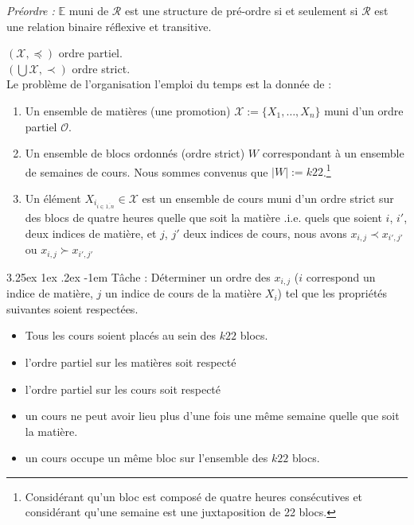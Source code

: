 \documentclass[12pt,a4paper,french]{article}
\makeatletter
\renewcommand\paragraph{\@startsection{paragraph}{5}{\z@}%
  {3.25ex \@plus1ex \@minus.2ex}%
  {-1em}%
  {\normalfont\normalsize\bfseries}}
\makeatother
\begin{document}
\begin{definition}{\emph{Préordre :} }
$\mathbb{E}$ muni de $\mathcal{R}$ est une structure de pré-ordre si et seulement si $\mathcal{R}$  est une relation binaire réflexive et transitive.\\
\end{definition}



$(\mathcal{X},\preceq)$ ordre partiel. \\
$(\bigcup\mathcal{X},\prec)$ ordre strict. \\


Le problème de l'organisation l'emploi du temps est la donnée de : 
\begin{enumerate}
\item Un ensemble de matières (une promotion) $\mathcal{X}:=\{X_{1},\dots, X_{n}\}$ muni d'un ordre partiel $\mathcal{O}$. \item Un ensemble de blocs ordonnés (ordre strict) $W$ correspondant à un ensemble de semaines de cours. Nous sommes convenus que $|W|:=k22$.\footnote{Considérant qu'un bloc est composé de quatre heures consécutives et considérant qu'une semaine est une juxtaposition de 22 blocs.}
\item Un élément $X_{i_{i\in\overline{1,n}}}\in\mathcal{X}$ est un ensemble de cours muni d'un ordre strict sur des blocs de quatre heures quelle que soit la matière .i.e. quels que soient $i$, $i'$, deux indices de matière, et $j$, $j'$ deux indices de cours, nous avons $x_{i,j} \prec x_{i',j'}$ ou $x_{i,j} \succ x_{i',j'}$


\end{enumerate} 

\paragraph{Tâche : } Déterminer un ordre des $x_{i,j}$ ($i$ correspond un indice de matière, $j$ un indice de cours de la matière $X_{i}$) tel que les propriétés suivantes soient respectées.
\begin{itemize}
\item Tous les cours soient placés au sein des $k22$ blocs.
\item l'ordre partiel sur les matières soit respecté
\item l'ordre partiel sur les cours soit respecté
\item un cours ne peut avoir lieu plus d'une fois une même semaine quelle que soit la matière.
\item un cours occupe un même bloc sur l'ensemble des $k22$ blocs.
\end{itemize}   
\end{document}
